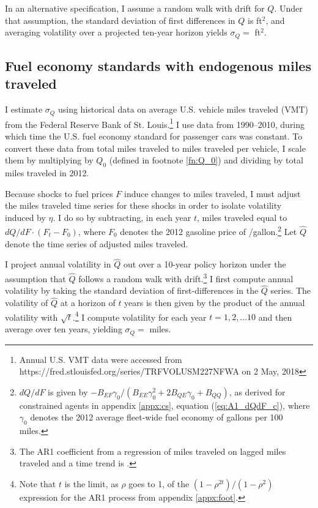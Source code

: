 \documentclass[12pt]{article}
\begin{document}
In an alternative specification, I assume a random walk with drift for $Q$. Under that assumption, the standard deviation of first differences in $Q$ is ft$^2$, and averaging volatility over a projected ten-year horizon yields $\sigma_Q=$ ft$^2$.



\subsection{Fuel economy standards with endogenous miles traveled} \label{appx:vmt}

I estimate $\sigma_Q$ using historical data on average U.S. vehicle miles traveled (VMT) from the Federal Reserve Bank of St. Louis.\footnote{Annual U.S. VMT data were accessed from https://fred.stlouisfed.org/series/TRFVOLUSM227NFWA on 2 May, 2018} I use data from 1990--2010, during which time the U.S. fuel economy standard for passenger cars was constant. To convert these data from total miles traveled to miles traveled per vehicle, I scale them by multiplying by $Q_0$ (defined in footnote \ref{fn:Q_0}) and dividing by total miles traveled in 2012. 

Because shocks to fuel prices $F$ induce changes to miles traveled, I must adjust the miles traveled time series for these shocks in order to isolate volatility induced by $\eta$. I do so by subtracting, in each year $t$, miles traveled equal to $dQ/dF\cdot(F_t-F_0)$, where $F_0$ denotes the 2012 gasoline price of \unskip/gallon.\footnote{$dQ/dF$ is given by $-B_{EF}\gamma_0/(B_{EE}\gamma_0^2+2B_{QE}\gamma_0+B_{QQ})$, as derived for constrained agents in appendix \ref{appx:cs}, equation (\ref{eq:A1_dQdF_c}), where $\gamma_0$ denotes the 2012 average fleet-wide fuel economy of gallons per 100 miles.} Let $\hat{Q}$ denote the time series of adjusted miles traveled.

I project annual volatility in $\hat{Q}$ out over a 10-year policy horizon under the assumption that $\hat{Q}$ follows a random walk with drift.\footnote{The AR1 coefficient from a regression of miles traveled on lagged miles traveled and a time trend is \unskip.} I first compute annual volatility by taking the standard deviation of first-differences in the $\hat{Q}$ series. The volatility of $\hat{Q}$ at a horizon of $t$ years is then given by the product of the annual volatility with $\sqrt{t}$.\footnote{Note that $t$ is the limit, as $\rho$ goes to 1, of the $(1-\rho^{2t})/(1-\rho^2)$ expression for the AR1 process from appendix \ref{appx:foot}.} I compute volatility for each year $t=1,2,...10$ and then average over ten years, yielding $\sigma_Q=$ miles.
\end{document}
